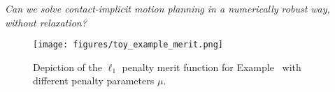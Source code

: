 



\emph{Can we solve contact-implicit motion planning in a numerically robust way, without relaxation?}
\begin{figure*}[tp]
    \centering
    \texttt{[image: figures/toy\_example\_merit.png]}
    \vspace{-4mm}
    \caption{
    Depiction of the $\ell_1$ penalty merit function for Example~ with different penalty parameters $\mu$.}
    \label{fig:toy_example_merit_function}
    \vspace{-4mm}
\end{figure*}

